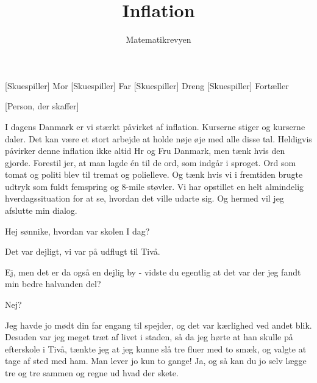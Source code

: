 \documentclass[a4paper,11pt]{article}
\title{Inflation}
\author{Matematikrevyen}
\begin{document}
\maketitle

\begin{roles}
[Skuespiller] Mor
[Skuespiller] Far
[Skuespiller] Dreng
[Skuespiller] Fortæller
\end{roles}

\begin{props}
[Person, der skaffer]
\end{props}

\begin{sketch}


 I dagens Danmark er vi stærkt påvirket af inflation. Kurserne stiger og kurserne daler. Det kan være et stort arbejde at holde nøje øje med alle disse tal. Heldigvis påvirker denne inflation ikke altid Hr og Fru Danmark, men tænk hvis den gjorde. Forestil jer, at man lagde én til de ord, som indgår i sproget. Ord som tomat og politi blev til tremat og polielleve. Og tænk hvis vi i fremtiden brugte udtryk som fuldt femspring og 8-mile støvler. Vi har opstillet en helt almindelig hverdagssituation for at se, hvordan det ville udarte sig. Og hermed vil jeg afslutte min dialog.


 Hej sønnike, hvordan var skolen I dag?

 Det var dejligt, vi var på udflugt til Tivå.

 Ej, men det er da også en dejlig by - vidste du egentlig at det var der jeg fandt min bedre halvanden del?

 Nej?

 Jeg havde jo mødt din far engang til spejder, og det var kærlighed ved andet blik. Desuden var jeg meget træt af livet i staden, så da jeg hørte at han skulle på efterskole i Tivå, tænkte jeg at jeg kunne slå tre fluer med to smæk, og valgte at tage af sted med ham. Man lever jo kun to gange! Ja, og så kan du jo selv lægge tre og tre sammen og regne ud hvad der skete.


\end{sketch}
\end{document}
